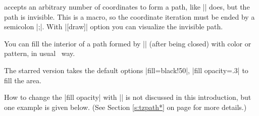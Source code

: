 \icmd{\tzpath} accepts an arbitrary number of coordinates to form a path, like |\tzlines| does, but the path is invisible. This is a  macro, so the coordinate iteration must be ended by a semicolon |;|.
With |[draw]| option you can visualize the invisible path.

\begin{tzcode}{.3}
\end{tzcode}

You can fill the interior of a path formed by |\tzpath| (after being closed) with color or pattern, in usual \Tikz\ way.

\begin{tzcode}{.3}
\end{tzcode}

\begin{tzcode}{.3}
\end{tzcode}



The starred version \icmd{\tzpath*} takes the default options |fill=black!50|, |fill opacity=.3| to fill the area.

\begin{tzcode}{.3}
\end{tzcode}

How to change the |fill opacity| with |\tzpath*| is not discussed in this introduction, but one example is given below. (See Section \ref{s:tzpath*} on page \pageref{s:tzpath*} for more details.)

\begin{tzcode}{.3}
\end{tzcode}




